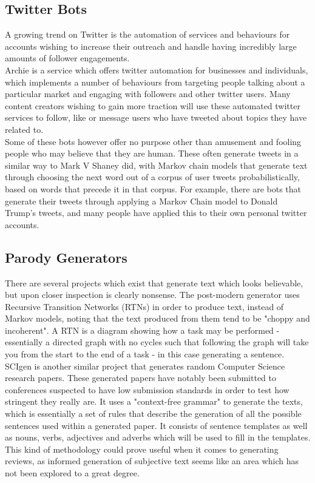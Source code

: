 \subsection{Twitter Bots}
A growing trend on Twitter is the automation of services and behaviours for accounts wishing to increase their outreach and handle having incredibly large amounts of follower engagements. \\
%
Archie\cite{Archie} is a service which offers twitter automation for businesses and individuals, which implements a number of behaviours from targeting people talking about a particular market and engaging with followers and other twitter users. Many content creators wishing to gain more traction will use these automated twitter services to follow, like or message users who have tweeted about topics they have related to.\\
%
Some of these bots however offer no purpose other than amusement and fooling people who may believe that they are human. These often generate tweets in a similar way to Mark V Shaney did, with Markov chain models that generate text through choosing the next word out of a corpus of user tweets probabilistically, based on words that precede it in that corpus. For example, there are bots that generate their tweets through applying a Markov Chain model to Donald Trump's tweets\cite{trump}, and many people have applied this to their own personal twitter accounts. 


\subsection{Parody Generators}
There are several projects which exist that generate text which looks believable, but upon closer inspection is clearly nonsense.
The post-modern generator uses Recursive Transition Networks (RTNs) in order to produce text, instead of Markov models, noting that the text produced from them tend to be "choppy and incoherent".\cite{pomo} A RTN is a diagram showing how a task may be performed - essentially a directed graph with no cycles such that following the graph will take you from the start to the end of a task - in this case generating a sentence.\\
SCIgen\cite{SCIGen} is another similar project that generates random Computer Science research papers. These generated papers have notably been submitted to conferences suspected to have low submission standards in order to test how stringent they really are. It uses a "context-free grammar" to generate the texts, which is essentially a set of rules that describe the generation of all the possible sentences used within a generated paper. It consists of sentence templates as well as nouns, verbs, adjectives and adverbs which will be used to fill in the templates. This kind of methodology could prove useful when it comes to generating reviews, as informed generation of subjective text seems like an area which has not been explored to a great degree.
\\


